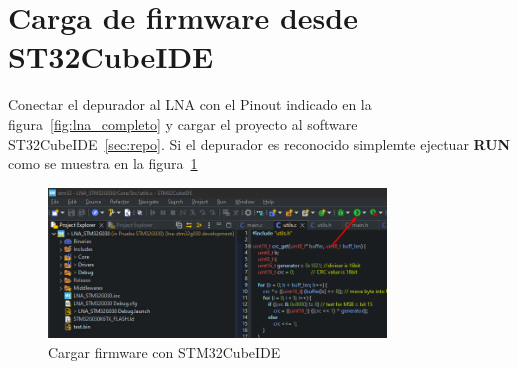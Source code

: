 \documentclass[12pt,twoside,onecolumn]{article}
\begin{document}

\section{Carga de firmware desde ST32CubeIDE}
Conectar el depurador al LNA con el Pinout indicado en la figura~\ref{fig:lna_completo} y cargar el proyecto al software ST32CubeIDE~\ref{sec:repo}. Si el depurador es reconocido simplemte ejectuar \textbf{RUN} como se muestra en la figura~\ref{fig:stm32-run}

\begin{figure}[H]
  \centering
   \includegraphics[width=0.8\textwidth]{figures/stm32-run.png}
  \caption{Cargar firmware con STM32CubeIDE}
    \label{fig:stm32-run}
\end{figure}
\end{document}
